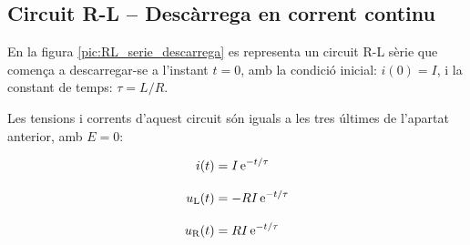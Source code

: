 \subsection{Circuit R-L -- Descàrrega en corrent continu}\label{sec:RL-descarrega}

En la figura \vref{pic:RL_serie_descarrega} es representa un circuit R-L sèrie que comença a descarregar-se a l'instant $t=0$, amb la condició inicial: $i(0) = I$, i la constant de temps: $\tau = L/R$.
\begin{center}
    
    \label{pic:RL_serie_descarrega}
\end{center}

\vspace{5mm}
Les tensions i corrents d'aquest circuit són iguals a les tres últimes de l'apartat anterior, amb $E=0$:

\hfill
\begin{minipage}[b]{9cm}
    
\end{minipage}
\hfill
\begin{minipage}[b]{6cm}
    \begin{align}
        i(t) &= I\,\mathrm{e}^{-t/\tau} \label{eq:RL-i-descarrega}\\[3mm]
        u_\mathrm{L}(t) &= - R I\,\mathrm{e}^{-t/\tau}\label{eq:RL-ul-descarrega} \\[3mm]
        u_\mathrm{R}(t) &= R I\,\mathrm{e}^{-t/\tau}
    \end{align}
\end{minipage}

\break

